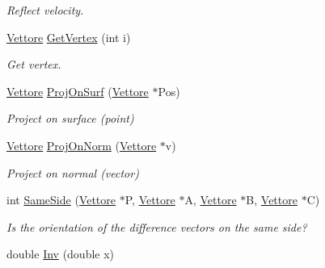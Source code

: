 \begin{DoxyCompactItemize}
\begin{DoxyCompactList}\small\item\em \-Reflect velocity. \end{DoxyCompactList}\item 
\hypertarget{classPiano_a1c0e56e45b12255147f5cbbc5a8e0b1f}{\hyperlink{classVettore}{\-Vettore} \hyperlink{classPiano_a1c0e56e45b12255147f5cbbc5a8e0b1f}{\-Get\-Vertex} (int i)}\label{classPiano_a1c0e56e45b12255147f5cbbc5a8e0b1f}

\begin{DoxyCompactList}\small\item\em \-Get vertex. \end{DoxyCompactList}\item 
\hypertarget{classPiano_a4aedb9029e37fb894e1e3a4514e4707d}{\hyperlink{classVettore}{\-Vettore} \hyperlink{classPiano_a4aedb9029e37fb894e1e3a4514e4707d}{\-Proj\-On\-Surf} (\hyperlink{classVettore}{\-Vettore} $\ast$\-Pos)}\label{classPiano_a4aedb9029e37fb894e1e3a4514e4707d}

\begin{DoxyCompactList}\small\item\em \-Project on surface (point) \end{DoxyCompactList}\item 
\hypertarget{classPiano_af86bbe20f8d523af9e2553f0039c088b}{\hyperlink{classVettore}{\-Vettore} \hyperlink{classPiano_af86bbe20f8d523af9e2553f0039c088b}{\-Proj\-On\-Norm} (\hyperlink{classVettore}{\-Vettore} $\ast$v)}\label{classPiano_af86bbe20f8d523af9e2553f0039c088b}

\begin{DoxyCompactList}\small\item\em \-Project on normal (vector) \end{DoxyCompactList}\item 
\hypertarget{classPiano_a07236f42214a9066ed4c12a8b62ada12}{int \hyperlink{classPiano_a07236f42214a9066ed4c12a8b62ada12}{\-Same\-Side} (\hyperlink{classVettore}{\-Vettore} $\ast$\-P, \hyperlink{classVettore}{\-Vettore} $\ast$\-A, \hyperlink{classVettore}{\-Vettore} $\ast$\-B, \hyperlink{classVettore}{\-Vettore} $\ast$\-C)}\label{classPiano_a07236f42214a9066ed4c12a8b62ada12}

\begin{DoxyCompactList}\small\item\em \-Is the orientation of the difference vectors on the same side? \end{DoxyCompactList}\item 
\hypertarget{classPiano_a9341053ea31914d454cab1a86e2f8dd9}{double \hyperlink{classPiano_a9341053ea31914d454cab1a86e2f8dd9}{\-Inv} (double x)}\label{classPiano_a9341053ea31914d454cab1a86e2f8dd9}


\end{DoxyCompactItemize}
